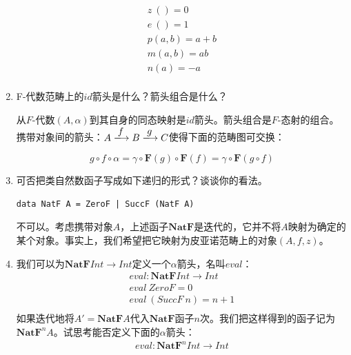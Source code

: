 \documentclass[UTF8]{article}
\begin{document}
\begin{enumerate}
\[\begin{array}{l}
z\ () = 0 \\
e\ () = 1 \\
p(a, b) = a + b \\
m(a, b) = ab \\
n(a) = -a \\
\end{array}\]

\item{F-代数范畴上的$id$箭头是什么？箭头组合是什么？}

从$F$-代数$(A, \alpha)$到其自身的同态映射是$id$箭头。箭头组合是$F$-态射的组合。携带对象间的箭头：$A \arrowto{f} B \arrowto{g} C$使得下面的范畴图可交换：

\begin{center}
\end{center}

\[
  g \circ f \circ \alpha = \gamma \circ \mathbf{F}(g) \circ \mathbf{F}(f) = \gamma \circ \mathbf{F}(g \circ f)
\]

\item{可否把类自然数函子写成如下递归的形式？谈谈你的看法。
\begin{lstlisting}
data NatF A = ZeroF | SuccF (NatF A)
\end{lstlisting}
}

不可以。考虑携带对象$A$，上述函子$\mathbf{NatF}$是迭代的，它并不将$A$映射为确定的某个对象。事实上，我们希望把它映射为皮亚诺范畴上的对象$(A, f, z)$。

\item{我们可以为$\mathbf{NatF} Int \to Int$定义一个$\alpha$箭头，名叫$eval$：
\[
\begin{array}{l}
eval : \mathbf{NatF} Int \to Int \\
eval\ ZeroF = 0 \\
eval\ (SuccF\ n) = n + 1 \\
\end{array}
\]
如果迭代地将$A' = \mathbf{NatF} A$代入$\mathbf{NatF}$函子$n$次。我们把这样得到的函子记为$\mathbf{NatF}^n A$。试思考能否定义下面的$\alpha$箭头：
\[
\begin{array}{l}
eval : \mathbf{NatF}^n Int \to Int \\
\end{array}
\]
}


\end{enumerate}
\end{document}
